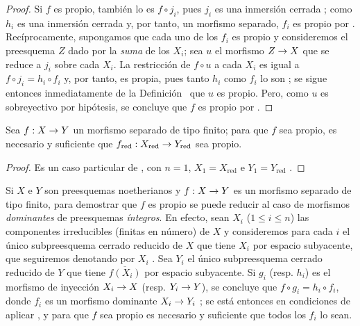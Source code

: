 \documentclass[oneside,10pt]{amsart}
\makeatletter
\renewcommand{\leq}{\leqslant}
\newcommand{\ega@arrow}[2]{\mathchoice{#1}{#2}{#2}{#2}}
\renewcommand{\to}{\ega@arrow{\longrightarrow}{\rightarrow}}
\newcommand{\oldpage}[2][]{\marginnote{\normalfont\footnotesize\textbf{#1}~|~#2}\ignorespaces}
\let\EGAOriginalLabel\label
\renewcommand{\label}[1]{\phantomsection\EGAOriginalLabel{#1}}
\makeatother
\begin{document}
\oldpage[II]{102}
\begin{proof}
Si $f$ es propio, también lo es $f\circ j_i$, pues $j_i$ es una inmersión cerrada ;
como $h_i$ es una inmersión cerrada y, por tanto, un morfismo separado, $f_i$ es propio por .
Recíprocamente, supongamos que cada uno de los $f_i$ es propio y consideremos el preesquema $Z$ dado por la \emph{suma} de los $X_i$; sea $u$ el morfismo $Z\to X$ que se reduce a $j_i$ sobre cada $X_i$.
La restricción de $f\circ u$ a cada $X_i$ es igual a $f\circ j_i=h_i\circ f_i$ y, por tanto, es propia, pues tanto $h_i$ como $f_i$ lo son ;
se sigue entonces inmediatamente de la Definición~ que $u$ es propio.
Pero, como $u$ es sobreyectivo por hipótesis, se concluye que $f$ es propio por .
\end{proof}

\begin{corollary}[5.4.6]
\label{II.5.4.6-fr}
Sea $f:X\to Y$ un morfismo separado de tipo finito; para que $f$ sea propio, es necesario y suficiente que $f_{\mathrm{red}}:X_{\mathrm{red}}\to Y_{\mathrm{red}}$ sea propio.
\end{corollary}

\begin{proof}
Es un caso particular de , con $n=1$, $X_1=X_{\mathrm{red}}$ e $Y_1=Y_{\mathrm{red}}$ .
\end{proof}

\begin{env}[5.4.7]
\label{II.5.4.7-fr}
Si $X$ e $Y$ son preesquemas noetherianos y $f:X\to Y$ es un morfismo separado de tipo finito, para demostrar que $f$ es propio se puede reducir al caso de morfismos \emph{dominantes} de preesquemas \emph{íntegros}.
En efecto, sean $X_i$ ($1\leq i\leq n$) las componentes irreducibles (finitas en número) de $X$ y consideremos para cada $i$ el único subpreesquema cerrado reducido de $X$ que tiene $X_i$ por espacio subyacente, que seguiremos denotando por $X_i$ .
Sea $Y_i$ el único subpreesquema cerrado reducido de $Y$ que tiene $\overline{f(X_i)}$ por espacio subyacente.
Si $g_i$ (resp. $h_i$) es el morfismo de inyección $X_i\to X$ (resp. $Y_i\to Y$), se concluye que $f\circ g_i=h_i\circ f_i$, donde $f_i$ es un morfismo dominante $X_i\to Y_i$ ;
se está entonces en condiciones de aplicar , y para que $f$ sea propio es necesario y suficiente que todos los $f_i$ lo sean.
\end{env}
\end{document}

